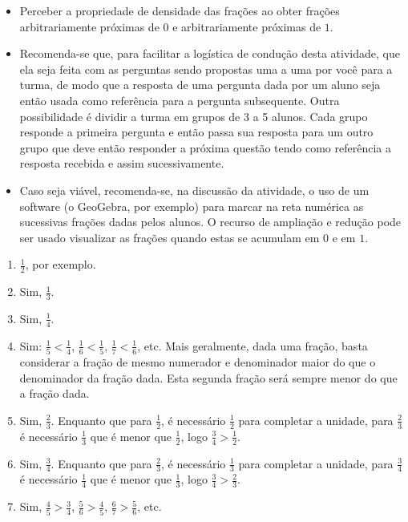 \begin{atividade}\label{chap4-ativ24}
\objetivos
\begin{itemize} %
    \item       Perceber a propriedade de densidade das frações ao obter frações
arbitrariamente próximas de       $0$       e arbitrariamente próximas de
$1$.
\end{itemize} %

\discussoes
\begin{itemize} %
    \item       Recomenda-se que, para facilitar a logística de condução desta
atividade, que ela seja feita com as perguntas sendo propostas uma a uma por
você para a turma, de modo que a resposta de uma pergunta dada por um aluno seja
então usada como referência para a pergunta subsequente. Outra possibilidade é
dividir a turma em grupos de 3 a 5 alunos. Cada grupo responde a primeira
pergunta e então passa sua resposta para um outro grupo que deve então responder
a próxima questão tendo como referência a resposta recebida e assim
sucessivamente.
    \item       Caso seja viável, recomenda-se, na discussão da atividade, o uso
de um software (o GeoGebra, por exemplo) para marcar na reta numérica as
sucessivas frações dadas pelos alunos. O recurso de ampliação e redução pode ser
usado visualizar as frações quando estas se acumulam em       $0$       e em
  $1$.
\end{itemize} %

\solucao
\begin{enumerate} %
    \item             $\frac{1}{2}$, por exemplo.
    \item       Sim,       $\frac{1}{3}$.
    \item       Sim,       $\frac{1}{4}$.
    \item       Sim:       $\frac{1}{5} < \frac{1}{4}$,       $\frac{1}{6} <
\frac{1}{5}$,       $\frac{1}{7} < \frac{1}{6}$, etc. Mais geralmente, dada uma
fração, basta considerar a fração de mesmo numerador e denominador maior do que
o denominador da fração dada. Esta segunda fração será sempre menor do que a
fração dada.
    \item       Sim,       $\frac{2}{3}$. Enquanto que para       $\frac{1}{2}$,
é necessário       $\frac{1}{2}$       para completar a unidade, para
$\frac{2}{3}$       é necessário       $\frac{1}{3}$       que é menor que
$\frac{1}{2}$, logo       $\frac{3}{4} > \frac{1}{2}$.
    \item       Sim,       $\frac{3}{4}$. Enquanto que para       $\frac{2}{3}$,
é necessário       $\frac{1}{3}$       para completar a unidade, para
$\frac{3}{4}$       é necessário       $\frac{1}{4}$       que é menor que
$\frac{1}{3}$, logo       $\frac{3}{4} > \frac{2}{3}$.
    \item       Sim,       $\frac{4}{5} > \frac{3}{4}$,       $\frac{5}{6} >
\frac{4}{5}$,       $\frac{6}{7} > \frac{5}{6}$, etc.
\end{enumerate} %


\end{atividade}
